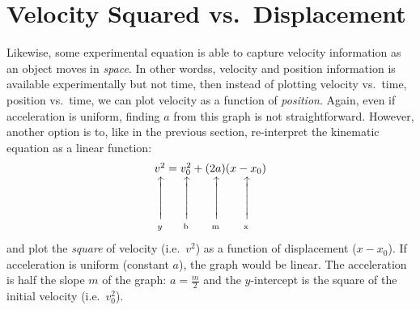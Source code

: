 \documentclass[11pt]{article}
\makeatletter
\newcommand\vertarrowbox[2]{%
    \begin{array}[t]{@{}c@{}} #1 \\
    \rotatebox{90}{$\xrightarrow{\hphantom{abcdefgh}}$} \\[-1ex]
    \mathclap{\scriptstyle\text{#2}}%
    \end{array}}
\makeatother
\begin{document}
\section{Velocity Squared vs.\ Displacement}
Likewise, some experimental equation is able to capture velocity information
as an object moves in \emph{space}. In other wordss, velocity and position
information is available experimentally but not time, then instead of plotting
velocity vs.\ time, position vs.\ time, we can plot velocity as a function of
\emph{position}. Again, even if acceleration is uniform, finding $a$ from this
graph is not straightforward. However, another option is to, like in the
previous section, re-interpret the kinematic equation as a linear function:
\begin{equation}
  \vertarrowbox{v^2}{$y$}=
  \vertarrowbox{v_0^2}{b}+\vertarrowbox{(2a)}{m}
  \vertarrowbox{(x-x_0)}{x}
\end{equation}
and plot the \emph{square} of velocity (i.e.\ $v^2$) as a function of
displacement ($x-x_0$). If acceleration is uniform (constant $a$), the graph
would be linear. The acceleration is half the slope $m$ of the graph:
$\displaystyle a=\frac{m}{2}$ and the $y$-intercept is the square of the
initial velocity (i.e.\ $v_0^2$).
\end{document}

